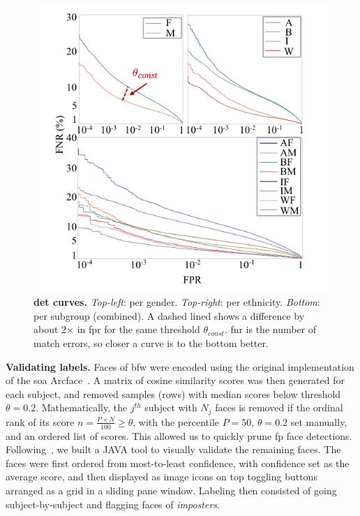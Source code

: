 \begin{figure}[!t] 
	\centering    
	\includegraphics[trim=7mm 0.1in 5mm 0in,clip,width=\linewidth]{images/detcurve-improved.pdf}
		\caption{\textbf{\gls{det} curves.} \emph{Top-left}: per gender. \emph{Top-right}: per ethnicity. \emph{Bottom}: per subgroup (\ie combined). A dashed lined shows a difference by about 2$\times$ in \gls{fpr} for the same threshold $\theta_{const}$. \gls{fnr} is the number of match errors, so closer a curve is to the bottom better.}
\label{fig:detcurves} 
\end{figure} 

\vspace{1mm}
\noindent\textbf{Validating labels.} 
Faces of \gls{bfw} were encoded using the original implementation of the \gls{soa} Arcface~\cite{deng2019arcface}. A matrix of cosine similarity scores was then generated for each subject, and removed samples (\ie rows) with median scores below threshold $\theta=0.2$. Mathematically, the $j^{th}$ subject with $N_j$ faces is removed if the ordinal rank of its score $n = \frac{P\times N}{100}\geq\theta$, with the percentile $P=50$, $\theta=0.2$ set manually, and an ordered list of scores. This allowed us to quickly prune \gls{fp} face detections. Following~\cite{robinson2016families, robinson2018visual}, we built a JAVA tool to visually validate the remaining faces. The faces were first ordered from most-to-least confidence, with confidence set as the average score, and then displayed as image icons on top toggling buttons arranged as a grid in a sliding pane window. Labeling then consisted of going subject-by-subject and flagging faces of \emph{imposters}. 


